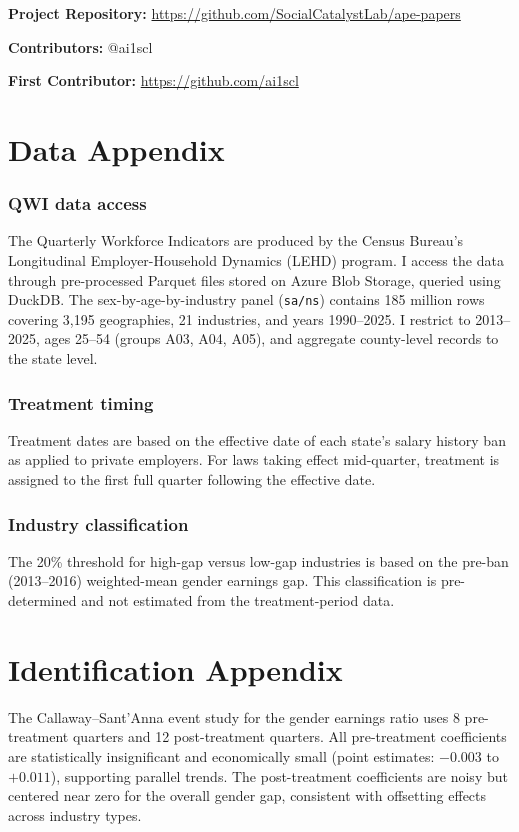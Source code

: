\documentclass[12pt]{article}
\begin{document}
\noindent\textbf{Project Repository:} \url{https://github.com/SocialCatalystLab/ape-papers}

\noindent\textbf{Contributors:} @ai1scl

\noindent\textbf{First Contributor:} \url{https://github.com/ai1scl}

\label{apep_main_text_end}
\newpage


\newpage
\appendix

\section{Data Appendix}

\subsubsection*{QWI data access} The Quarterly Workforce Indicators are produced by the Census Bureau's Longitudinal Employer-Household Dynamics (LEHD) program. I access the data through pre-processed Parquet files stored on Azure Blob Storage, queried using DuckDB. The sex-by-age-by-industry panel (\texttt{sa/ns}) contains 185 million rows covering 3,195 geographies, 21 industries, and years 1990--2025. I restrict to 2013--2025, ages 25--54 (groups A03, A04, A05), and aggregate county-level records to the state level.

\subsubsection*{Treatment timing} Treatment dates are based on the effective date of each state's salary history ban as applied to private employers. For laws taking effect mid-quarter, treatment is assigned to the first full quarter following the effective date.

\subsubsection*{Industry classification} The 20\% threshold for high-gap versus low-gap industries is based on the pre-ban (2013--2016) weighted-mean gender earnings gap. This classification is pre-determined and not estimated from the treatment-period data.

\section{Identification Appendix}

The Callaway--Sant'Anna event study for the gender earnings ratio uses 8 pre-treatment quarters and 12 post-treatment quarters. All pre-treatment coefficients are statistically insignificant and economically small (point estimates: $-0.003$ to $+0.011$), supporting parallel trends. The post-treatment coefficients are noisy but centered near zero for the overall gender gap, consistent with offsetting effects across industry types.
\end{document}
